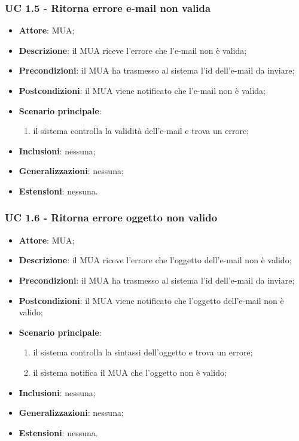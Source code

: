     \subsubsection{UC 1.5 - Ritorna errore e-mail non valida} \label{sec:UC1.5}
    \begin{itemize}
        \item \textbf{Attore}: MUA;
        \item \textbf{Descrizione}: il MUA riceve l'errore che l'e-mail non è valida;
        \item \textbf{Precondizioni}: il MUA ha trasmesso al sistema l'id dell'e-mail da inviare;
        \item \textbf{Postcondizioni}: il MUA viene notificato che l'e-mail non è valida;
        \item \textbf{Scenario principale}:
            \begin{enumerate}
                \item il sistema controlla la validità dell'e-mail e trova un errore;
            \end{enumerate}
        \item \textbf{Inclusioni}: nessuna;
        \item \textbf{Generalizzazioni}: nessuna;
        \item \textbf{Estensioni}: nessuna.
    \end{itemize}

    \subsubsection{UC 1.6 - Ritorna errore oggetto non valido} \label{sec:UC1.6}
    \begin{itemize}
        \item \textbf{Attore}: MUA;
        \item \textbf{Descrizione}: il MUA riceve l'errore che l'oggetto dell'e-mail non è valido;
        \item \textbf{Precondizioni}: il MUA ha trasmesso al sistema l'id dell'e-mail da inviare;
        \item \textbf{Postcondizioni}: il MUA viene notificato che l'oggetto dell'e-mail non è valido;
        \item \textbf{Scenario principale}:
            \begin{enumerate}
                \item il sistema controlla la sintassi dell'oggetto e trova un errore;
                \item il sistema notifica il MUA che l'oggetto non è valido;
            \end{enumerate}
        \item \textbf{Inclusioni}: nessuna;
        \item \textbf{Generalizzazioni}: nessuna;
        \item \textbf{Estensioni}: nessuna.
    \end{itemize}

